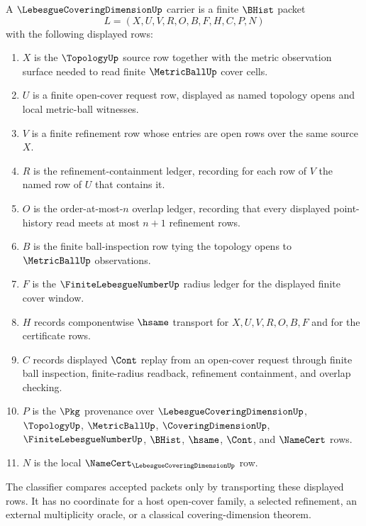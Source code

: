 \begin{definition}
\label{def:lebesgue-covering-dimension-carrier}
A $\LebesgueCoveringDimensionUp$ carrier is a finite $\BHist$ packet
$$
L=(X,U,V,R,O,B,F,H,C,P,N)
$$
with the following displayed rows:
\begin{enumerate}
\item $X$ is the $\TopologyUp$ source row together with the metric observation
surface needed to read finite $\MetricBallUp$ cover cells.
\item $U$ is a finite open-cover request row, displayed as named topology
opens and local metric-ball witnesses.
\item $V$ is a finite refinement row whose entries are open rows over the same
source $X$.
\item $R$ is the refinement-containment ledger, recording for each row of $V$
the named row of $U$ that contains it.
\item $O$ is the order-at-most-$n$ overlap ledger, recording that every
displayed point-history read meets at most $n+1$ refinement rows.
\item $B$ is the finite ball-inspection row tying the topology opens to
$\MetricBallUp$ observations.
\item $F$ is the $\FiniteLebesgueNumberUp$ radius ledger for the displayed
finite cover window.
\item $H$ records componentwise $\hsame$ transport for $X,U,V,R,O,B,F$ and
for the certificate rows.
\item $C$ records displayed $\Cont$ replay from an open-cover request through
finite ball inspection, finite-radius readback, refinement containment, and
overlap checking.
\item $P$ is the $\Pkg$ provenance over $\LebesgueCoveringDimensionUp$,
$\TopologyUp$, $\MetricBallUp$, $\CoveringDimensionUp$,
$\FiniteLebesgueNumberUp$, $\BHist$, $\hsame$, $\Cont$, and $\NameCert$ rows.
\item $N$ is the local $\NameCert_{\LebesgueCoveringDimensionUp}$ row.
\end{enumerate}
The classifier compares accepted packets only by transporting these displayed
rows. It has no coordinate for a host open-cover family, a selected refinement,
an external multiplicity oracle, or a classical covering-dimension theorem.
\end{definition}

